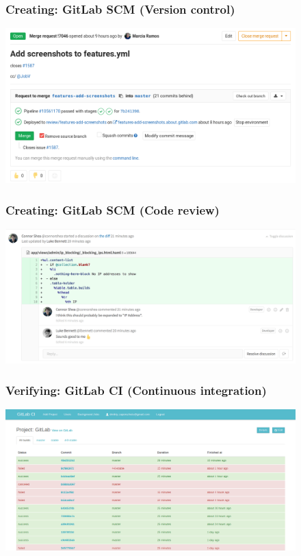 \documentclass[notes]{beamer}
\begin{document}
\begin{frame}
  \begin{figure}
    \frametitle{Creating: GitLab SCM (Version control)}
    \centering
    \includegraphics[scale=0.3]{version-control.png}
  \end{figure}
\end{frame}

\begin{frame}
  \begin{figure}
    \frametitle{Creating: GitLab SCM (Code review)}
    \centering
    \includegraphics[scale=0.25]{code-review.png}
  \end{figure}
\end{frame}

\begin{frame}
  \begin{figure}
    \frametitle{Verifying: GitLab CI (Continuous integration)}
    \centering
    \includegraphics[scale=0.2]{ci.png}
  \end{figure}
\end{frame}
\end{document}
